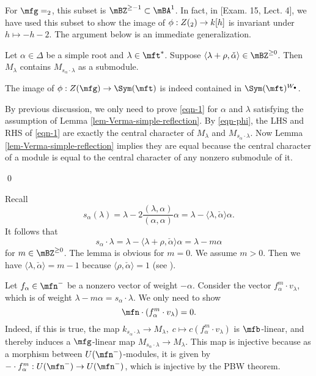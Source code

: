 	\begin{exam}
		For $\mfg=\sl_2$, this subset is $\mBZ^{\ge -1}\subset \mBA^1$. In fact, in [Exam. 15, Lect. 4], we have used this subset to show the image of $\phi:Z(\sl_2) \to k[h]$ is invariant under $h\mapsto -h-2$. The argument below is an immediate generalization.
	\end{exam}

	\begin{lem}
		\label{lem-Verma-simple-reflection}
		Let $\alpha\in \Delta$ be a simple root and $\lambda\in \mft^*$. Suppose $\langle \lambda+\rho, \check\alpha \rangle \in \mBZ^{\ge 0} $. Then $M_\lambda$ contains $M_{s_\alpha\cdot \lambda}$ as a submodule.
	\end{lem}

	\begin{cor}
		The image of $\phi: Z(\mfg)\to \Sym(\mft)$ is indeed contained in $\Sym(\mft)^{W_\bullet}$. 
	\end{cor}

	\proof
		By previous discussion, we only need to prove \eqref{eqn-1} for $\alpha$ and $\lambda$ satisfying the assumption of Lemma \ref{lem-Verma-simple-reflection}. By \eqref{eqn-phi}, the LHS and RHS of \eqref{eqn-1} are exactly the central character of $M_\lambda$ and $M_{s_\alpha\cdot \lambda}$. Now Lemma \ref{lem-Verma-simple-reflection} implies they are equal because the central character of a module is equal to the central character of any nonzero submodule of it.

	\qed

		Recall 
		\[
			s_\alpha(\lambda) = \lambda - 2\frac{(\lambda,\alpha)}{(\alpha,\alpha)}\alpha = \lambda - \langle \lambda,\check\alpha  \rangle \alpha.
		\]
		It follows that
		\[
			s_\alpha \cdot \lambda = \lambda - \langle \lambda+\rho, \check\alpha \rangle  \alpha  = \lambda - m\alpha
		\]
		for $m\in \mBZ^{\ge 0}$. The lemma is obvious for $m=0$. We assume $m>0$. Then we have $\langle \lambda,\check \alpha \rangle = m-1$ because $\langle \rho,\check\alpha \rangle = 1$ (see \cite[Cor. to Lem. 10.2(B)]{H1}).

		Let $f_\alpha\in \mfn^-$ be a nonzero vector of weight $-\alpha$. Consider the vector $f_\alpha^m \cdot v_\lambda$, which is of weight $\lambda-m\alpha=s_\alpha \cdot \lambda$. We only need to show
		\[
			\mfn \cdot (f_\alpha^m \cdot v_\lambda) =0.
		\]
		Indeed, if this is true, the map $k_{s_\alpha \cdot \lambda}\to M_\lambda,\; c\mapsto c(f_\alpha^m \cdot v_\lambda)$ is $\mfb$-linear, and thereby induces a $\mfg$-linear map $M_{s_\alpha\cdot \lambda}\to M_{\lambda}$. This map is injective because as a morphism between $U(\mfn^-)$-modules, it is given by $ -\cdot f_\alpha^m : U(\mfn^-) \to U(\mfn^-)$, which is injective by the PBW theorem.


